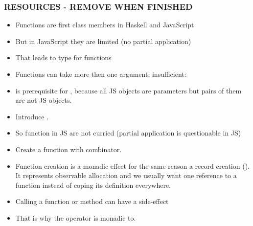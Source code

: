 \subsubsection{RESOURCES - REMOVE WHEN FINISHED}

\begin{itemize}
\item Functions are first class members in Haskell and JavaScript
\item But in JavaScript they are limited (no partial application)
\item That leads to type for functions 
\item Functions can take more then one argument;  insufficient: 
\item {} is prerequisite for ,
because all JS objects are parameters but pairs of them are not 
JS objects.
\item Introduce .
\item So function in JS are not curried (partial application is questionable in JS)
\item Create a function with  combinator.
\item Function creation is a monadic effect for the same reason 
a record creation (). It represents observable
allocation and we usually want one reference to a function 
instead of coping its definition everywhere.
\item Calling a function or method can have a side-effect
\item That is why the operator \Src{\$\$} is monadic to.
\end{itemize}






